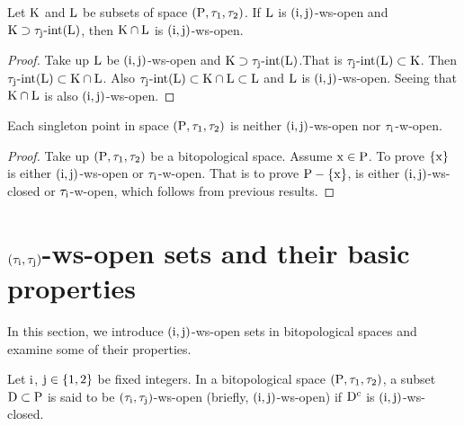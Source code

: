 \begin{coro}\label{coro7.2.36}
Let $\mathrm{K}$ and $\mathrm{L}$ be subsets of space $(\mathrm{P}, \tau_1, \tau_2 )$. If $\mathrm{L}$ is $(\mathrm{i}, \mathrm{j})$-ws-open and $\mathrm{K} \supset  \tau_{\mathrm{j}}\text{-int}(\mathrm{L})$, then $\mathrm{K}\cap \mathrm{L}$ is $(\mathrm{i}, \mathrm{j})$-ws-open.
\end{coro}

\begin{proof}
Take up $\mathrm{L}$ be $(\mathrm{i}, \mathrm{j})$-ws-open and $\mathrm{K} \supset \tau_{\mathrm{j}}\text{-int}(\mathrm{L})$.That is $\tau_{\mathrm{j}}\text{-int}(\mathrm{L})\subset\mathrm{K}$. Then $\tau_{\mathrm{j}}\text{-int}(\mathrm{L})\subset \mathrm{K}\cap \mathrm{L}$. Also $\tau_{\mathrm{j}}\text{-int}(\mathrm{L}) \subset \mathrm{K}\cap \mathrm{L}\subset\mathrm{L}$ and $\mathrm{L}$ is $(\mathrm{i}, \mathrm{j})$-ws-open. Seeing that $\mathrm{K}\cap \mathrm{L}$ is also $(\mathrm{i}, \mathrm{j})$-ws-open.
\end{proof}

\begin{thm}\label{thm7.2.37}
Each singleton point in space $(\mathrm{P}, \tau_1, \tau_2 )$ is neither $(\mathrm{i}, \mathrm{j})$-ws-open nor $\tau_{\mathrm{i}}$-w-open.
\end{thm}

\begin{proof}
Take up $(\mathrm{P}, \tau_1, \tau_2 )$ be a bitopological space. Assume $\mathrm{x}\in\mathrm{P}$. To prove $\{\mathrm{x}\}$ is either $(\mathrm{i}, \mathrm{j})$-ws-open or $\tau_{\mathrm{i}}$-w-open. That is to prove $\mathrm{P}-\{\mathrm{x}\}$, is either $(\mathrm{i}, \mathrm{j})$-ws-closed or $\tau_{\mathrm{i}}$-w-open, which follows from previous results.
\end{proof}

\section{\boldmath$(\tau_{\mathrm{i}}, \tau_{\mathrm{j}} )$-ws-open sets and their basic properties}

In this section, we introduce $(\mathrm{i}, \mathrm{j})$-ws-open sets in bitopological spaces and examine some of their properties.

\begin{dfn}\label{defi7.3.1}
Let $\mathrm{i}$, $\mathrm{j}\in\{1, 2\}$ be fixed integers. In a bitopological space $(\mathrm{P}, \tau_1, \tau_2 )$, a subset $\mathrm{D} \subset \mathrm{P}$ is said to be $(\tau_{\mathrm{i}}, \tau_{\mathrm{j}} )$-ws-open (briefly, $(\mathrm{i}, \mathrm{j})$-ws-open) if $\mathrm{D}^{\text{c}}$ is $(\mathrm{i}, \mathrm{j})$-ws-closed.
\end{dfn}

